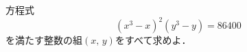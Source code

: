 \documentclass[../../main.tex]{subfiles}
\begin{document}
方程式
\[ {(x^3-x)}^2(y^3-y)=86400 \]
を満たす整数の組$(x, \, y)$をすべて求めよ．
\end{document}
